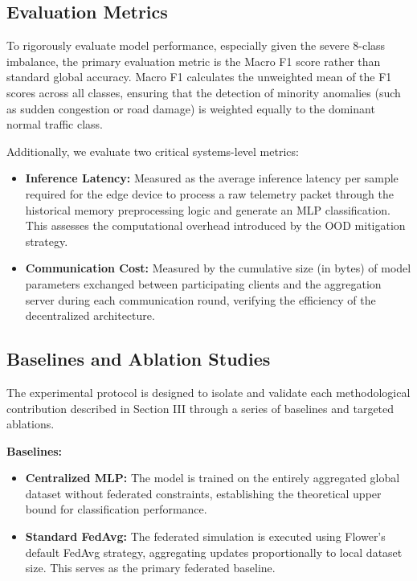 \subsection{Evaluation Metrics}

To rigorously evaluate model performance, especially given the severe 8-class imbalance, the primary evaluation metric is the Macro F1 score rather than standard global accuracy. Macro F1 calculates the unweighted mean of the F1 scores across all classes, ensuring that the detection of minority anomalies (such as sudden congestion or road damage) is weighted equally to the dominant normal traffic class. 

Additionally, we evaluate two critical systems-level metrics:
\begin{itemize}
    \item \textbf{Inference Latency:} Measured as the average inference latency per sample required for the edge device to process a raw telemetry packet through the historical memory preprocessing logic and generate an MLP classification. This assesses the computational overhead introduced by the OOD mitigation strategy.
    \item \textbf{Communication Cost:} Measured by the cumulative size (in bytes) of model parameters exchanged between participating clients and the aggregation server during each communication round, verifying the efficiency of the decentralized architecture.
\end{itemize}

\subsection{Baselines and Ablation Studies}

The experimental protocol is designed to isolate and validate each methodological contribution described in Section III through a series of baselines and targeted ablations.

\textbf{Baselines:}
\begin{itemize}
    \item \textbf{Centralized MLP:} The model is trained on the entirely aggregated global dataset without federated constraints, establishing the theoretical upper bound for classification performance.
    \item \textbf{Standard FedAvg:} The federated simulation is executed using Flower's default FedAvg strategy, aggregating updates proportionally to local dataset size. This serves as the primary federated baseline.
\end{itemize}


